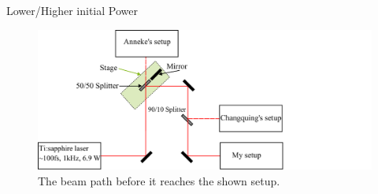\documentclass[aspectratio=1610, 9pt]{beamer}
\begin{document}
\begin{frame}{Lower/Higher initial Power}
  \begin{figure}
    \centering
    \includegraphics[width=\textwidth]{images/Aufbau_vor.pdf}
    \caption{The beam path before it reaches the shown setup.}
  \end{figure}
\end{frame} 
\end{document}
